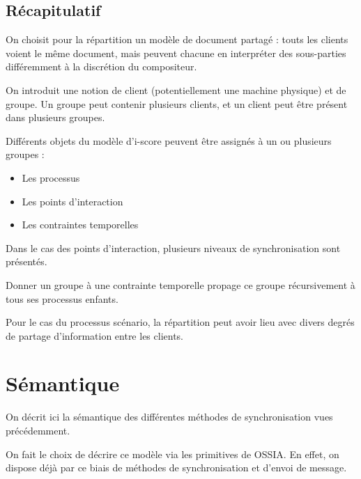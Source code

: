 \documentclass{article}
\newcommand\ossia{OSSIA\xspace}
\begin{document}
\subsection{Récapitulatif}
On choisit pour la répartition un modèle de document partagé : touts les clients voient le même document, mais peuvent chacune en interpréter des sous-parties différemment à la discrétion du compositeur.

On introduit une notion de client (potentiellement une machine physique) et de groupe.
Un groupe peut contenir plusieurs clients, et un client peut être présent dans plusieurs groupes.

Différents objets du modèle d'i-score peuvent être assignés à un ou plusieurs groupes : 

\begin{itemize}
	\item Les processus
	\item Les points d'interaction
	\item Les contraintes temporelles
\end{itemize}

Dans le cas des points d'interaction, plusieurs niveaux de synchronisation sont présentés.

Donner un groupe à une contrainte temporelle propage ce groupe récursivement à tous ses processus enfants.

Pour le cas du processus scénario, la répartition peut avoir lieu avec divers degrés de partage d'information entre les clients.


\section{Sémantique}\label{sec.semantique}
On décrit ici la sémantique des différentes méthodes de synchronisation vues précédemment.

On fait le choix de décrire ce modèle via les primitives de \ossia{}. 
En effet, on dispose déjà par ce biais de méthodes de synchronisation et d'envoi de message.

\end{document}
